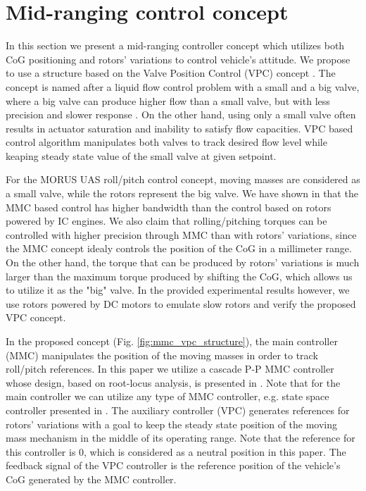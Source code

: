 \section{Mid-ranging control concept}
\label{sec:control}
In this section we present a mid-ranging controller concept which utilizes both CoG positioning and rotors' variations to control vehicle's attitude. We propose to use a structure based on the Valve Position Control (VPC) concept \cite{Allison2003MidRanging}. The concept is named after a liquid flow control problem with a small and a big valve, where a big valve can produce higher flow than a small valve, but with less precision and slower response \cite{Allison1997MidRanging}. On the other hand, using only a small valve often results in actuator saturation and inability to satisfy flow capacities. VPC based control algorithm manipulates both valves to track desired flow level while keaping steady state value of the small valve at given setpoint.

For the MORUS UAS roll/pitch control concept, moving masses are considered as a small valve, while the rotors represent the big valve. We have shown in \cite{Haus2017} that the MMC based control has higher bandwidth than the control based on rotors powered by IC engines. We also claim that rolling/pitching torques can be controlled with higher precision through MMC than with rotors' variations, since the MMC concept idealy controls the position of the CoG in a millimeter range. On the other hand, the torque that can be produced by rotors' variations is much larger than the maximum torque produced by shifting the CoG, which allows us to utilize it as the "big" valve. In the provided experimental results however, we use rotors powered by DC motors to emulate slow rotors and verify the proposed VPC concept. 

In the proposed concept (Fig. \ref{fig:mmc_vpc_structure}), the main controller (MMC) manipulates the position of the moving masses in order to track roll/pitch references. In this paper we utilize a cascade P-P MMC controller whose design, based on root-locus analysis, is presented in \cite{Haus2017}. Note that for the main controller we can utilize any type of MMC controller, e.g. state space controller presented in \cite{Morus2017Icuas}. The auxiliary controller (VPC) generates references for rotors' variations with a goal to keep the steady state position of the moving mass mechanism in the middle of its operating range. Note that the reference for this controller is 0, which is considered as a neutral position in this paper. The feedback signal of the VPC controller is the reference position of the vehicle's CoG  generated by the MMC controller. 

